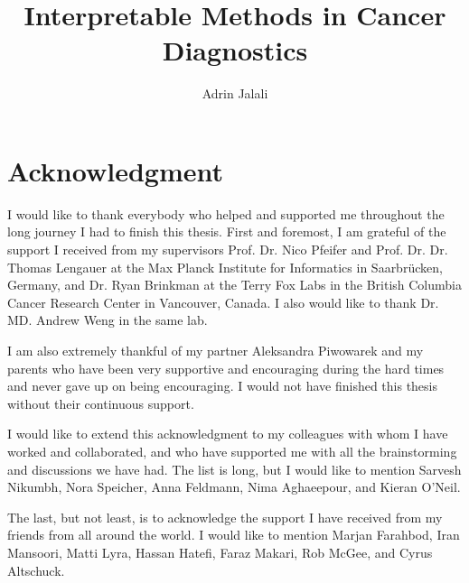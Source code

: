 \documentclass{thesis}
\title{Interpretable Methods in Cancer Diagnostics}
\author{Adrin Jalali}
\begin{document}
\frontmatter

\maketitle
\tableofcontents


\chapter{Acknowledgment}
I would like to thank everybody who helped and supported me throughout the long
journey I had to finish this thesis. First and foremost, I am grateful of the
support I received from my supervisors Prof. Dr. Nico Pfeifer and Prof. Dr. Dr.
Thomas Lengauer at the Max Planck Institute for Informatics in Saarbr\"ucken,
Germany, and Dr. Ryan Brinkman at the Terry Fox Labs in the British Columbia
Cancer Research Center in Vancouver, Canada. I also would like to thank Dr. MD.
Andrew Weng in the same lab.

I am also extremely thankful of my partner Aleksandra Piwowarek and my parents
who have been very supportive and encouraging during the hard times and never
gave up on being encouraging. I would not have finished this thesis without
their continuous support.

I would like to extend this acknowledgment to my colleagues with whom I have
worked and collaborated, and who have supported me with all the brainstorming
and discussions we have had. The list is long, but I would like to mention
Sarvesh Nikumbh, Nora Speicher, Anna Feldmann, Nima Aghaeepour, and Kieran
O'Neil.

The last, but not least, is to acknowledge the support I have received from my
friends from all around the world. I would like to mention Marjan Farahbod,
Iran Mansoori, Matti Lyra, Hassan Hatefi, Faraz Makari, Rob McGee, and Cyrus
Altschuck.


\mainmatter
\end{document}
